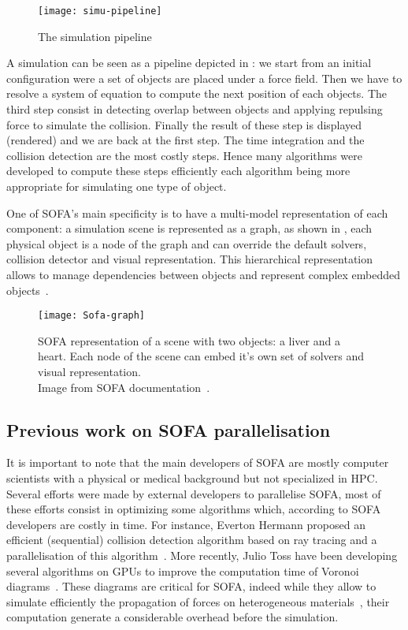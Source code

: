 \begin{figure}[htb]
    \centering
    \texttt{[image: simu-pipeline]}
    \caption[The simulation pipeline]{The simulation pipeline}
    \label{fig:simu-pipeline}
\end{figure}


A simulation can be seen as a pipeline depicted in : we
start from an initial configuration were a set of objects are placed under a
force field. Then we have to resolve a system of equation to compute the next
position of each objects. The third step consist in detecting overlap between
objects and applying repulsing force to simulate the collision.  Finally the
result of these step is displayed (rendered) and we are back at the first
step. The time integration and the collision detection are the most costly
steps. Hence many algorithms  were developed to compute these steps
efficiently each algorithm being more appropriate for simulating one type of
object.

One of \gls{SOFA}'s main specificity is to have a multi-model representation
of each component: a simulation scene is represented as a graph, as shown in
, each physical object is a node of the graph and can override
the default solvers, collision detector and visual representation. This
hierarchical representation allows to manage dependencies between objects and
represent complex embedded objects~\cite{Nesme09Preserving,Faure11Sparse}.

\begin{figure}[htb]
    \centering
    \texttt{[image: Sofa-graph]}
    \caption[Example of SOFA scene graph]{SOFA representation of a scene with two objects: a liver and a
        heart. Each node of the scene can embed it's own set of solvers and
        visual representation.\\
        Image from SOFA documentation~\cite{SOFA16Sofa}.}
    \label{fig:sofa-tree}
\end{figure}

\subsection{Previous work on SOFA parallelisation}

It is important to note that the main developers of \gls{SOFA} are  mostly
computer scientists with a physical or medical background but not specialized
in \gls{HPC}. Several efforts were made by external developers to parallelise
\gls{SOFA}, most of these efforts consist in optimizing some algorithms which,
according to \gls{SOFA} developers are costly in time. For instance, Everton
Hermann proposed an efficient (sequential) collision detection algorithm based
on ray tracing and a parallelisation of this
algorithm~\cite{Hermann08Raytraced}. More recently, Julio Toss have been
developing several algorithms on \glspl{GPU} to improve the computation time
of Voronoi diagrams~\cite{Toss13Parallel,Toss14Parallel}. These diagrams are
critical for \gls{SOFA}, indeed while they allow to simulate efficiently the
propagation of forces on heterogeneous materials~\cite{Faure11Sparse}, their
computation generate a considerable overhead before the simulation.

